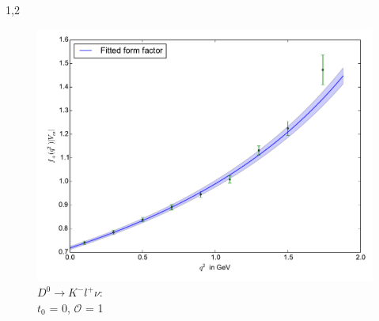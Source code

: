 \documentclass[11pt,a4paper,twoside,draft]{report}
\begin{document}
\begin{spacing}{1,2}



 
 \begin{minipage}[H]{0.45\textwidth}
 \begin{figure}[H]
 \includegraphics[width=1\textwidth]{Fit/D0-1Ord-0.pdf}
 \caption{$D^0\rightarrow K^- l^+ \nu$: \\$t_0$ = 0, $\mathcal{O}$ = 1}
 \label{pic_D0-1Ord-0}
 \end{figure}
 \end{minipage}
 \hfill
 \begin{minipage}[H]{0.45\textwidth}
 \begin{figure}[H]

\end{figure}
\end{minipage}
\end{spacing}
\end{document}

